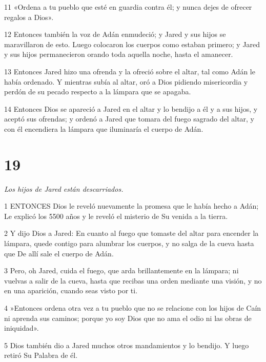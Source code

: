 \par 11 «Ordena a tu pueblo que esté en guardia contra él; y nunca dejes de ofrecer regalos a Dios».

\par 12 Entonces también la voz de Adán enmudeció; y Jared y sus hijos se maravillaron de esto. Luego colocaron los cuerpos como estaban primero; y Jared y sus hijos permanecieron orando toda aquella noche, hasta el amanecer.

\par 13 Entonces Jared hizo una ofrenda y la ofreció sobre el altar, tal como Adán le había ordenado. Y mientras subía al altar, oró a Dios pidiendo misericordia y perdón de su pecado respecto a la lámpara que se apagaba.

\par 14 Entonces Dios se apareció a Jared en el altar y lo bendijo a él y a sus hijos, y aceptó sus ofrendas; y ordenó a Jared que tomara del fuego sagrado del altar, y con él encendiera la lámpara que iluminaría el cuerpo de Adán.

\chapter{19}

\par \textit{Los hijos de Jared están descarriados.}

\par 1 ENTONCES Dios le reveló nuevamente la promesa que le había hecho a Adán; Le explicó los 5500 años y le reveló el misterio de Su venida a la tierra.

\par 2 Y dijo Dios a Jared: En cuanto al fuego que tomaste del altar para encender la lámpara, quede contigo para alumbrar los cuerpos, y no salga de la cueva hasta que De allí sale el cuerpo de Adán.

\par 3 Pero, oh Jared, cuida el fuego, que arda brillantemente en la lámpara; ni vuelvas a salir de la cueva, hasta que recibas una orden mediante una visión, y no en una aparición, cuando seas visto por ti.

\par 4 »Entonces ordena otra vez a tu pueblo que no se relacione con los hijos de Caín ni aprenda sus caminos; porque yo soy Dios que no ama el odio ni las obras de iniquidad».

\par 5 Dios también dio a Jared muchos otros mandamientos y lo bendijo. Y luego retiró Su Palabra de él.

